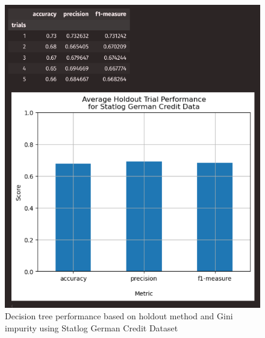 \documentclass{article}
\begin{document}
    \begin{figure}[H]
        \centering
        \begin{minipage}[t]{0.47\textwidth}
            \centering
            \includegraphics[width=\textwidth, height=0.35\textheight]{1hg.png}
            \caption{Decision tree performance based on holdout method and Gini impurity using Statlog German Credit Dataset}
        \end{minipage}
        \hfill
        \begin{minipage}[t]{0.47\textwidth}
            \centering

\end{minipage}
\end{figure}
\end{document}
